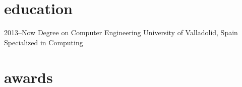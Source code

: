 \documentclass[]{friggeri-cv} %
\begin{document}

\section{education}

\begin{entrylist}


\entry
{2013--Now}
{Degree {\normalfont on Computer Engineering} }
{University of Valladolid, Spain}
{Specialized in Computing}



\end{entrylist}



\section{awards}
\end{document}
